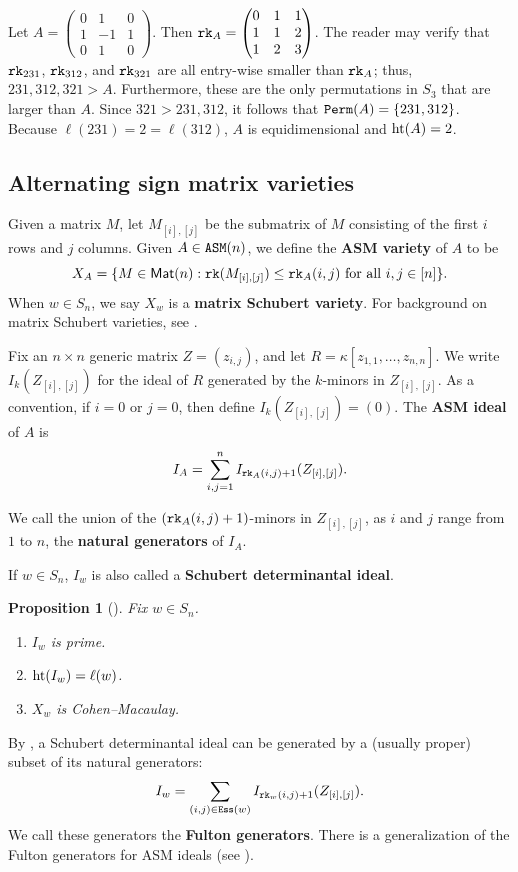 \documentclass[12pt,reqno]{amsart}
\newtheorem{proposition}[theorem]{Proposition}
\newtheorem{Main Conjecture}[theorem]{Main Conjecture}
\theoremstyle{remark}
\newenvironment{example}
  {\pushQED{\qed}\renewcommand{\qedsymbol}{$\diamondsuit$}\examplex}
  {\popQED\endexamplex}
\theoremstyle{plain}
\newcommand{\mydef}[1]{{\bf #1}}
\newcommand{\hgt}{{\rm{ht }}}
\newcommand{\ess}{{\tt Ess}}
\newcommand{\perm}{{\tt Perm}}
\newcommand{\asm}{{\tt ASM}}
\newcommand{\rk}{{\tt rk}}
\newcommand{\mat}{{\sf Mat}}
\begin{document}
\begin{example}
\label{example:smallASM}
Let $A=\begin{pmatrix}0&1&0\\1&-1&1\\0&1&0\end{pmatrix}$.  Then $\rk_A=\begin{pmatrix}0&1&1\\1&1&2\\1&2&3\end{pmatrix}$.  The reader may verify that $\rk_{231}$, $\rk_{312}$, and $\rk_{321}$ are all entry-wise smaller than $\rk_A$; thus, $231,312,321>A$.  Furthermore, these are the only permutations in $S_3$ that are larger than $A$.  Since $321>231,312$, it follows that $\perm(A)=\{231,312\}$.  Because $\ell(231) = 2 = \ell(312)$, $A$ is equidimensional and $\hgt(A) =2$.
\end{example}


\subsection{Alternating sign matrix varieties}

Given a matrix $M$, let $M_{[i],[j]}$ be the submatrix of $M$ consisting of the first $i$ rows and $j$ columns.   Given $A\in \asm(n)$, we define the \mydef{ASM variety} of $A$ to be \[X_A=\{M\in \mat(n): \rk(M_{[i],[j]})\leq \rk_A(i,j) \text{ for all } i,j\in [n]\}.\]  When $w\in S_n$, we say $X_w$ is a \mydef{matrix Schubert variety}.  For background on matrix Schubert varieties, see \cite{Ful92, MS04}.

Fix an $n \times n$ generic matrix $Z=(z_{i,j})$, and let $R=\kappa[z_{1,1}, \ldots, z_{n,n}]$. We write $I_k(Z_{[i],[j]})$ for the ideal of $R$ generated by the $k$-minors in $Z_{[i],[j]}$.  As a convention, if $i=0$ or $j=0$, then define $I_k(Z_{[i],[j]})=(0)$. 
The \mydef{ASM ideal} of $A$ is \[
I_A=\sum_{i,j=1}^n I_{\rk_A(i,j)+1}(Z_{[i],[j]}).
\]

We call the union of the $(\rk_A(i,j)+1)$-minors in $Z_{[i],[j]}$, as $i$ and $j$ range from $1$ to $n$, the \mydef{natural generators} of $I_A$. 
 
If $w\in S_n$, $I_w$ is also called a \mydef{Schubert determinantal ideal}.  

\begin{proposition}[{\cite[Proposition~3.3]{Ful92}}]
\label{prop:matSchubFacts}
	Fix $w\in S_n$.
	\begin{enumerate}
		\item $I_w$ is prime.
		\item $\hgt (I_w)=\ell(w)$.
		\item $X_w$ is Cohen--Macaulay.
	\end{enumerate}
\end{proposition}
By \cite[Lemma~3.10]{Ful92}, a Schubert determinantal ideal can be generated by a (usually proper) subset of its natural generators: \[I_w=\sum_{(i,j)\in\ess(w)}I_{\rk_w(i,j)+1}(Z_{[i],[j]}).\]  We call these generators the \mydef{Fulton generators}.  There is a generalization of the Fulton generators for ASM ideals (see \cite[Lemma~5.9]{Wei}).
\end{document}
